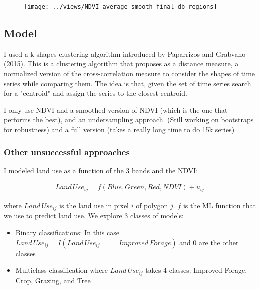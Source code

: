 \documentclass[10pt,a4paper,onecolumn]{article}
\begin{document}
  \begin{figure}[H] \centering
            \captionsetup{justification=centering}
              \texttt{[image: ../views/NDVI\_average\_smooth\_final\_db\_regions]}
              
 \end{figure}





\subsection{Model}


I used a k-shapes clustering algorithm introduced by Paparrizos and Grabvano (2015). This is a clustering algorithm that proposes as a distance measure, a normalized version of the cross-correlation measure to consider the shapes of time series while comparing them. The idea is that, given the set of time series search for a "centroid" and assign the series to the closest centroid. 

I only use NDVI and a smoothed version of NDVI (which is the one that performs the best), and an undersampling approach. (Still working on bootstraps for robustness) and a full version (takes a really long time to do 15k series)



\subsubsection{Other unsuccessful approaches}

I modeled land use as a function of the 3 bands and the NDVI:

\begin{align}
Land\,Use_{ij} =f(Blue, Green, Red, NDVI) + u_{ij}
\end{align}

where $Land\,Use_{ij}$ is the land use in pixel $i$ of polygon $j$. $f$ is the ML function that we use to predict land use. We explore 3 classes of models:

\begin{itemize}
  \item Binary classifications: In this case $Land\,Use_{ij}=I(Land\,Use_{ij}==Improved\,Forage)$ and 0 are the other classes
  \item Multiclass classification where $Land\,Use_{ij}$ takes 4 classes: Improved Forage, Crop, Grazing, and Tree
\end{itemize}
\end{document}
